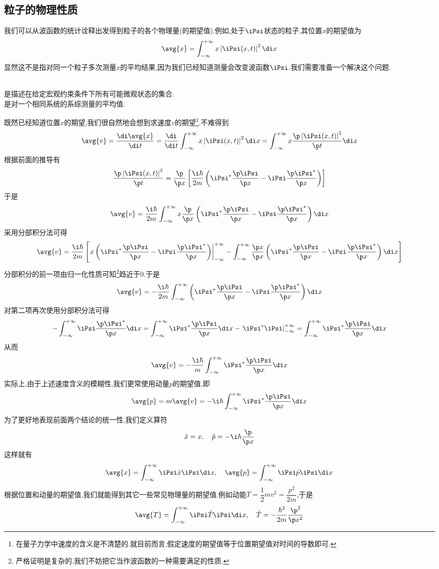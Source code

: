 \documentclass{ctexart}
\begin{document}
\subsection{粒子的物理性质}
我们可以从波函数的统计诠释出发得到粒子的各个物理量(的期望值).例如,处于$\iPsi$状态的粒子,其位置$x$的期望值为
\[\avg{x}=\int_{-\infty}^{+\infty}x\left|\iPsi(x,t)\right|^2\di x\]
显然这不是指对同一个粒子多次测量$x$的平均结果,因为我们已经知道测量会改变波函数$\iPsi$.我们需要准备一个解决这个问题.
\begin{definition}[系综与期望值]\\
    是描述在给定宏观约束条件下所有可能微观状态的集合.\\
    是对一个相同系统的系综测量的平均值.
\end{definition}
既然已经知道位置$x$的期望,我们很自然地会想到求速度$v$的期望\footnote{在量子力学中速度的含义是不清楚的.就目前而言,假定速度的期望值等于位置期望值对时间的导数即可.}.不难得到
\[\avg{v}=\dfrac{\di\avg{x}}{\di t}=\dfrac{\di}{\di t}\int_{-\infty}^{+\infty}x\left|\iPsi(x,t)\right|^2\di x=\int_{-\infty}^{+\infty}x\dfrac{\p\left|\iPsi(x,t)\right|^2}{\p t}\di x\]
根据前面的推导有
\[\dfrac{\p\left|\iPsi(x,t)\right|^2}{\p t}=\dfrac{\p}{\p x}\left[\dfrac{\i\hbar}{2m}\left(\iPsi^\ast\dfrac{\p\iPsi}{\p x}-\iPsi\dfrac{\p\iPsi^\ast}{\p x}\right)\right]\]
于是
\[\avg{v}=\dfrac{\i\hbar}{2m}\int_{-\infty}^{+\infty}x\dfrac{\p}{\p x}\left(\iPsi^\ast\dfrac{\p\iPsi}{\p x}-\iPsi\dfrac{\p\iPsi^\ast}{\p x}\right)\di x\]
采用分部积分法可得
\[\avg{v}=\dfrac{\i\hbar}{2m}\left[\left.x\left(\iPsi^\ast\dfrac{\p\iPsi}{\p x}-\iPsi\dfrac{\p\iPsi^\ast}{\p x}\right)\right|_{-\infty}^{+\infty}-\int_{-\infty}^{+\infty}\dfrac{\p x}{\p x}\left(\iPsi^\ast\dfrac{\p\iPsi}{\p x}-\iPsi\dfrac{\p\iPsi^\ast}{\p x}\right)\di x\right]\]
分部积分的前一项由归一化性质可知\footnote{严格证明是复杂的,我们不妨把它当作波函数的一种需要满足的性质.}趋近于$0$.于是
\[\avg{v}=-\dfrac{\i\hbar}{2m}\int_{-\infty}^{+\infty}\left(\iPsi^\ast\dfrac{\p\iPsi}{\p x}-\iPsi\dfrac{\p\iPsi^\ast}{\p x}\right)\di x\]
对第二项再次使用分部积分法可得
\[-\int_{-\infty}^{+\infty}\iPsi\dfrac{\p\iPsi^\ast}{\p x}\di x=\int_{-\infty}^{+\infty}\iPsi^\ast\dfrac{\p\iPsi}{\p x}\di x-\left.\iPsi^\ast\iPsi\right|_{-\infty}^{+\infty}=\int_{-\infty}^{+\infty}\iPsi^\ast\dfrac{\p\iPsi}{\p x}\di x\]
从而
\[\avg{v}=-\dfrac{\i\hbar}{m}\int_{-\infty}^{+\infty}\iPsi^\ast\dfrac{\p\iPsi}{\p x}\di x\]
实际上,由于上述速度含义的模糊性,我们更常使用动量$p$的期望值,即
\[\avg{p}=m\avg{v}=-\i\hbar\int_{-\infty}^{+\infty}\iPsi^\ast\dfrac{\p\iPsi}{\p x}\di x\]
为了更好地表现前面两个结论的统一性,我们定义算符
\[\hat{x}=x,\quad\hat{p}=-\i\hbar\dfrac{\p}{\p x}\]
这样就有
\[\avg{x}=\int_{-\infty}^{+\infty}\iPsi\hat{x}\iPsi\di x,\quad\avg{p}=\int_{-\infty}^{+\infty}\iPsi\hat{p}\iPsi\di x\]
根据位置和动量的期望值,我们就能得到其它一些常见物理量的期望值.例如动能$T=\dfrac{1}{2}mv^2=\dfrac{p^2}{2m}$,于是
\[\avg{T}=\int_{-\infty}^{+\infty}\iPsi\hat{T}\iPsi\di x,\quad\hat{T}=-\dfrac{\hbar^2}{2m}\dfrac{\p^2}{\p x^2}\]
\end{document}
